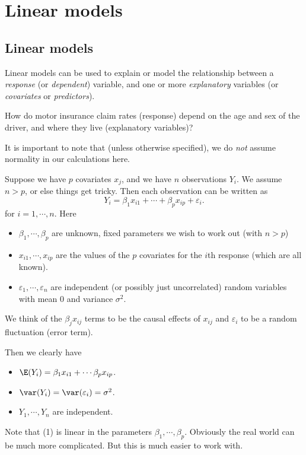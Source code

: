 \documentclass[a4paper]{article}
\begin{document}
\section{Linear models}
\subsection{Linear models}
Linear models can be used to explain or model the relationship between a \emph{response} (or \emph{dependent}) variable, and one or more \emph{explanatory} variables (or \emph{covariates} or \emph{predictors}).

\begin{eg}
  How do motor insurance claim rates (response) depend on the age and sex of the driver, and where they live (explanatory variables)?
\end{eg}

It is important to note that (unless otherwise specified), we do \emph{not} assume normality in our calculations here.

Suppose we have $p$ covariates $x_j$, and we have $n$ observations $Y_i$. We assume $n > p$, or else things get tricky. Then each observation can be written as
\[
  Y_i = \beta_1 x_{i1} + \cdots + \beta_p x_{ip} + \varepsilon_i.\tag{1}
\]
for $i = 1, \cdots, n$. Here
\begin{itemize}
  \item $\beta_1, \cdots, \beta_p$ are unknown, fixed parameters we wish to work out (with $n > p$)
  \item $x_{i1}, \cdots, x_{ip}$ are the values of the $p$ covariates for the $i$th response (which are all known).
  \item $\varepsilon_1, \cdots, \varepsilon_n$ are independent (or possibly just uncorrelated) random variables with mean 0 and variance $\sigma^2$.
\end{itemize}
We think of the $\beta_j x_{ij}$ terms to be the causal effects of $x_{ij}$ and $\varepsilon_i$ to be a random fluctuation (error term).

Then we clearly have
\begin{itemize}
  \item $\E(Y_i) = \beta_1 x_{i1} + \cdots \beta_px_{ip}$.
  \item $\var(Y_i) = \var(\varepsilon_i) = \sigma^2$.
  \item $Y_1, \cdots, Y_n$ are independent.
\end{itemize}
Note that (1) is linear in the parameters $\beta_1, \cdots, \beta_p$. Obviously the real world can be much more complicated. But this is much easier to work with.
\end{document}
